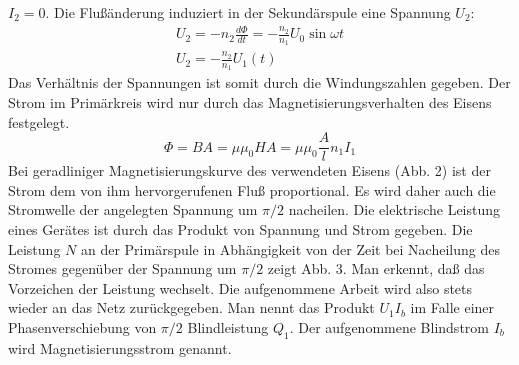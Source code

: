\documentclass[12pt,a4paper,twoside]{article}
\theoremstyle{definition}
\begin{document}
$I_2 = 0$. Die Flußänderung induziert in der Sekundärspule eine Spannung $U_2$:
\begin{gather}
    U_2 = -n_2 \frac{d \Phi}{d t} = - \frac{n_2}{n_1} U_0 \sin \omega t \\
    U_2 = - \frac{n_2}{n_1} U_1(t)
\end{gather}
Das Verhältnis der Spannungen ist somit durch die Windungszahlen gegeben. Der Strom im Primärkreis wird nur durch das Magnetisierungsverhalten des Eisens festgelegt.
\begin{equation}
    \Phi = B A = \mu \mu_0 H A = \mu \mu_0 \frac{A}{l} n_1 I_1
\end{equation}
Bei geradliniger Magnetisierungskurve des verwendeten Eisens (Abb. 2) ist der Strom dem von ihm hervorgerufenen Fluß proportional. Es wird daher auch die Stromwelle der angelegten Spannung um $\pi/2$ nacheilen. Die elektrische Leistung eines Gerätes ist durch das Produkt von Spannung und Strom gegeben. Die Leistung $N$ an der Primärspule in Abhängigkeit von der Zeit bei Nacheilung des Stromes gegenüber der Spannung um $\pi/2$ zeigt Abb. 3. Man erkennt, daß das Vorzeichen der Leistung wechselt. Die aufgenommene Arbeit wird also stets wieder an das Netz zurückgegeben. Man nennt das Produkt $U_1 I_b$ im Falle einer Phasenverschiebung von $\pi/2$ Blindleistung $Q_1$. Der aufgenommene Blindstrom $I_b$ wird Magnetisierungsstrom genannt.
\end{document}
